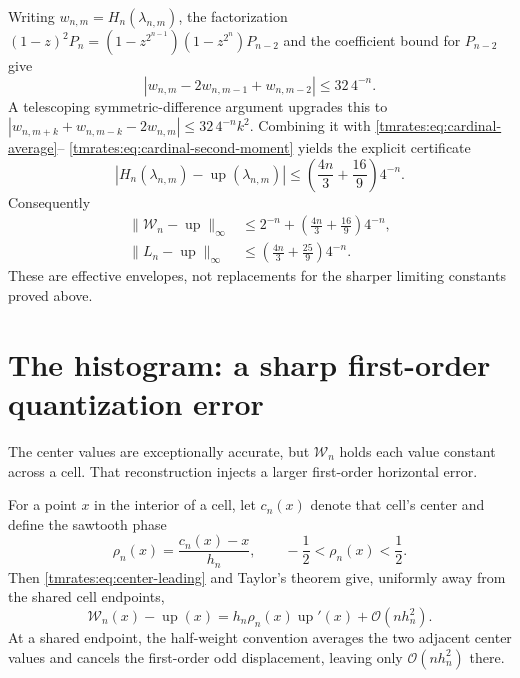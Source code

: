 \documentclass[11pt,oneside]{article}
\theoremstyle{definition}
\theoremstyle{remark}
\newcommand{\Up}{\operatorname{up}}
\newcommand{\bigO}{\mathcal O}
\begin{document}
Writing $w_{n,m}=H_n(\lambda_{n,m})$, the factorization
$(1-z)^2P_n=(1-z^{2^{n-1}})(1-z^{2^n})P_{n-2}$ and the coefficient bound for
$P_{n-2}$ give
\begin{equation}
 |w_{n,m}-2w_{n,m-1}+w_{n,m-2}|\le32\,4^{-n}.
 \label{tmrates:eq:discrete-curvature}
\end{equation}
A telescoping symmetric-difference argument upgrades this to
$|w_{n,m+k}+w_{n,m-k}-2w_{n,m}|\le32\,4^{-n}k^2$.
Combining it with \eqref{tmrates:eq:cardinal-average}--
\eqref{tmrates:eq:cardinal-second-moment} yields the explicit certificate
\begin{equation}
 |H_n(\lambda_{n,m})-\Up(\lambda_{n,m})|
 \le\left(\frac{4n}{3}+\frac{16}{9}\right)4^{-n}.
 \label{tmrates:eq:effective-center-bound}
\end{equation}
Consequently
\begin{align}
 \|\mathcal W_n-\Up\|_\infty
 &\le2^{-n}+\left(\frac{4n}{3}+\frac{16}{9}\right)4^{-n},
 \label{tmrates:eq:effective-histogram-bound}\\
 \|L_n-\Up\|_\infty
 &\le\left(\frac{4n}{3}+\frac{25}{9}\right)4^{-n}.
 \label{tmrates:eq:effective-linear-bound}
\end{align}
These are effective envelopes, not replacements for the sharper limiting constants proved
above.

\section{The histogram: a sharp first-order quantization error}
\label{tmrates:sec:histogram-rate}

The center values are exceptionally accurate, but $\mathcal W_n$ holds each value constant
across a cell.  That reconstruction injects a larger first-order horizontal error.

For a point $x$ in the interior of a cell, let $c_n(x)$ denote that cell's center and define
the sawtooth phase
\begin{equation}
 \rho_n(x)=\frac{c_n(x)-x}{h_n},
 \qquad -\frac12<\rho_n(x)<\frac12.                       \label{tmrates:eq:rho}
\end{equation}
Then \eqref{tmrates:eq:center-leading} and Taylor's theorem give, uniformly away from the shared cell
endpoints,
\begin{equation}
 \mathcal W_n(x)-\Up(x)
 =h_n\rho_n(x)\Up'(x)+\bigO(nh_n^2).                      \label{tmrates:eq:hist-local}
\end{equation}
At a shared endpoint, the half-weight convention averages the two adjacent center values and
cancels the first-order odd displacement, leaving only $\bigO(nh_n^2)$ there.
\end{document}

